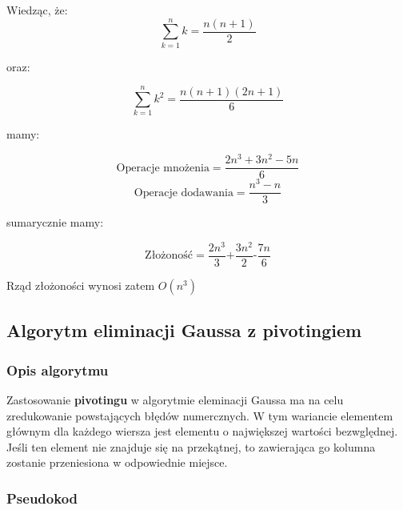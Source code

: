 \documentclass[12pt,a4paper,table]{article}
\begin{document}
    Wiedząc, że:
    \begin{equation}
        \sum_{k=1}^{n} k = \frac{n(n + 1)}{2}
    \end{equation}

    oraz:

    \begin{equation}
        \sum_{k=1}^{n} k^2 = \frac{n(n + 1)(2n + 1)}{6}
    \end{equation}

    mamy:

    \begin{equation}
        \text{Operacje mnożenia} = \frac{2n^3 + 3n^2 - 5n}{6}
    \end{equation}
    \begin{equation}
        \text{Operacje dodawania} = \frac{n^3 - n}{3} 
    \end{equation}

    sumarycznie mamy:
    
    \begin{equation}
        \text{Złożoność} = \frac{2n^3}{3} \text{+} \frac{3n^2}{2} \text{-} \frac{7n}{6}
    \end{equation}

    Rząd złożoności wynosi zatem $O(n^3)$
    
    \subsection{Algorytm eliminacji Gaussa z pivotingiem}    
    \subsubsection{Opis algorytmu}
    Zastosowanie \textbf{pivotingu} w algorytmie eleminacji Gaussa ma na celu zredukowanie powstających błędów numercznych. W tym wariancie elementem głównym dla każdego wiersza jest elementu o największej wartości bezwględnej. Jeśli ten element nie znajduje się na przekątnej, to zawierająca go kolumna zostanie przeniesiona w odpowiednie miejsce.
    \subsubsection{Pseudokod}
    
\end{document}
